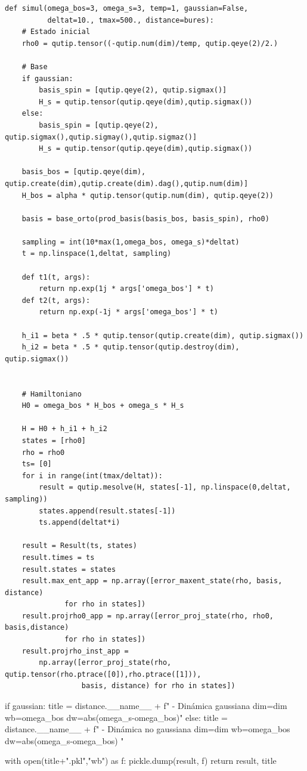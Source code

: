\documentclass{report} %
\numberwithin{equation}{section}
\begin{document}
\begin{verbatim}
def simul(omega_bos=3, omega_s=3, temp=1, gaussian=False,         
          deltat=10., tmax=500., distance=bures):
    # Estado inicial
    rho0 = qutip.tensor((-qutip.num(dim)/temp, qutip.qeye(2)/2.) 
    
    # Base
    if gaussian:
        basis_spin = [qutip.qeye(2), qutip.sigmax()]
        H_s = qutip.tensor(qutip.qeye(dim),qutip.sigmax())
    else:
        basis_spin = [qutip.qeye(2), qutip.sigmax(),qutip.sigmay(),qutip.sigmaz()]
        H_s = qutip.tensor(qutip.qeye(dim),qutip.sigmax())
        
    basis_bos = [qutip.qeye(dim), qutip.create(dim),qutip.create(dim).dag(),qutip.num(dim)]
    H_bos = alpha * qutip.tensor(qutip.num(dim), qutip.qeye(2))
    
    basis = base_orto(prod_basis(basis_bos, basis_spin), rho0)
    
    sampling = int(10*max(1,omega_bos, omega_s)*deltat)
    t = np.linspace(1,deltat, sampling)
    
    def t1(t, args):
        return np.exp(1j * args['omega_bos'] * t) 
    def t2(t, args):
        return np.exp(-1j * args['omega_bos'] * t) 
    
    h_i1 = beta * .5 * qutip.tensor(qutip.create(dim), qutip.sigmax())
    h_i2 = beta * .5 * qutip.tensor(qutip.destroy(dim), qutip.sigmax())

    
    # Hamiltoniano
    H0 = omega_bos * H_bos + omega_s * H_s 
   
    H = H0 + h_i1 + h_i2
    states = [rho0]
    rho = rho0    
    ts= [0]
    for i in range(int(tmax/deltat)):
        result = qutip.mesolve(H, states[-1], np.linspace(0,deltat, sampling))
        states.append(result.states[-1])
        ts.append(deltat*i)

    result = Result(ts, states)
    result.times = ts
    result.states = states
    result.max_ent_app = np.array([error_maxent_state(rho, basis, distance) 
              for rho in states])
    result.projrho0_app = np.array([error_proj_state(rho, rho0, basis,distance) 
              for rho in states])
    result.projrho_inst_app =
        np.array([error_proj_state(rho, qutip.tensor(rho.ptrace([0]),rho.ptrace([1])), 
                  basis, distance) for rho in states])
\end{verbatim}
\begin{Omitir}
    if gaussian:
        title = distance.__name__ +
                f" - Dinámica gaussiana dim={dim} wb={omega_bos} dw={abs(omega_s-omega_bos)}"
    else:
        title = distance.__name__ + 
                f" - Dinámica no gaussiana dim={dim} wb={omega_bos}
                      dw={abs(omega_s-omega_bos)} " 

    with open(title+".pkl","wb") as f:
        pickle.dump(result, f)
    return result, title
\end{Omitir}
\end{document}
